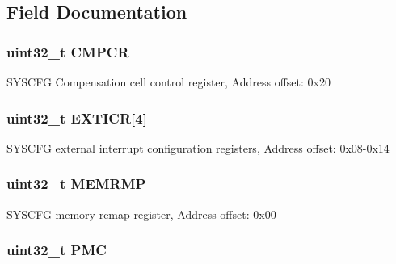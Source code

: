 \subsection{Field Documentation}
\hypertarget{struct_s_y_s_c_f_g___type_def_a08ddbac546fa9928256654d31255c8c3}{
\subsubsection[{C\-M\-P\-C\-R}]{ uint32\-\_\-t C\-M\-P\-C\-R}}\label{struct_s_y_s_c_f_g___type_def_a08ddbac546fa9928256654d31255c8c3}
S\-Y\-S\-C\-F\-G Compensation cell control register, Address offset\-: 0x20 \hypertarget{struct_s_y_s_c_f_g___type_def_a52f7bf8003ba69d66a4e86dea6eeab65}{
\subsubsection[{E\-X\-T\-I\-C\-R}]{ uint32\-\_\-t E\-X\-T\-I\-C\-R\mbox{[}4\mbox{]}}}\label{struct_s_y_s_c_f_g___type_def_a52f7bf8003ba69d66a4e86dea6eeab65}
S\-Y\-S\-C\-F\-G external interrupt configuration registers, Address offset\-: 0x08-\/0x14 \hypertarget{struct_s_y_s_c_f_g___type_def_ab36c409d0a009e3ce5a89ac55d3ff194}{
\subsubsection[{M\-E\-M\-R\-M\-P}]{ uint32\-\_\-t M\-E\-M\-R\-M\-P}}\label{struct_s_y_s_c_f_g___type_def_ab36c409d0a009e3ce5a89ac55d3ff194}
S\-Y\-S\-C\-F\-G memory remap register, Address offset\-: 0x00 \hypertarget{struct_s_y_s_c_f_g___type_def_a2130abf1fefb63ce4c4b138fd8c9822a}{
\subsubsection[{P\-M\-C}]{ uint32\-\_\-t P\-M\-C}}\label{struct_s_y_s_c_f_g___type_def_a2130abf1fefb63ce4c4b138fd8c9822a}
